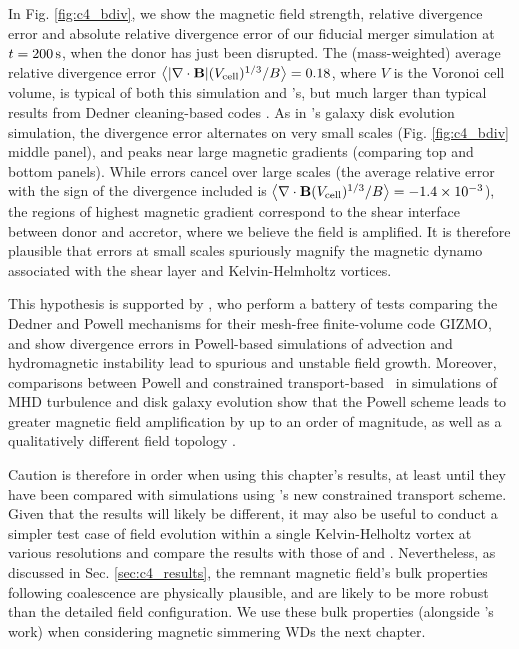 In Fig. \ref{fig:c4_bdiv}, we show the magnetic field strength, relative divergence error and absolute relative divergence error of our fiducial merger simulation at $t = 200\,\mathrm{s}$, when the donor has just been disrupted.  The (mass-weighted) average relative divergence error $\left\langle|\mathbf{\nabla\cdot B}|(V_\mathrm{cell})^{1/3}/B\right\rangle = 0.18$, where $V$ is the Voronoi cell volume, is typical of both this simulation and \cite{pakms13}'s, but much larger than typical results from Dedner cleaning-based codes \citep{tric15, hopkr16}.  As in \cite{pakms13}'s galaxy disk evolution simulation, the divergence error alternates on very small scales (Fig. \ref{fig:c4_bdiv} middle panel), and peaks near large magnetic gradients (comparing top and bottom panels).  While errors cancel over large scales (the average relative error with the sign of the divergence included is $\left\langle\mathbf{\nabla\cdot B}(V_\mathrm{cell})^{1/3}/B\right\rangle = -1.4\times10^{-3}$), the regions of highest magnetic gradient correspond to the shear interface between donor and accretor, where we believe the field is amplified.  It is therefore plausible that errors at small scales spuriously magnify the magnetic dynamo associated with the shear layer and Kelvin-Helmholtz vortices.  

This hypothesis is supported by \cite{hopkr16}, who perform a battery of tests comparing the Dedner and Powell mechanisms for their mesh-free finite-volume code \textsc{GIZMO}, and show divergence errors in Powell-based simulations of advection and hydromagnetic instability lead to spurious and unstable field growth.  Moreover, comparisons between Powell and constrained transport-based \arepo\ in simulations of MHD turbulence and disk galaxy evolution show that the Powell scheme leads to greater magnetic field amplification by up to an order of magnitude, as well as a qualitatively different field topology \citep{mocz+16}.



Caution is therefore in order when using this chapter's results, at least until they have been compared with simulations using \arepo's new constrained transport scheme.  Given that the results will likely be different, it may also be useful to conduct a simpler test case of field evolution within a single Kelvin-Helholtz vortex at various resolutions and compare the results with those of \cite{oberam10} and \cite{zrakm13}.  Nevertheless, as discussed in Sec. \ref{sec:c4_results}, the remnant magnetic field's bulk properties following coalescence are physically plausible, and are likely to be more robust than the detailed field configuration.  We use these bulk properties (alongside \cite{ji+13}'s work) when considering magnetic simmering WDs the next chapter.

